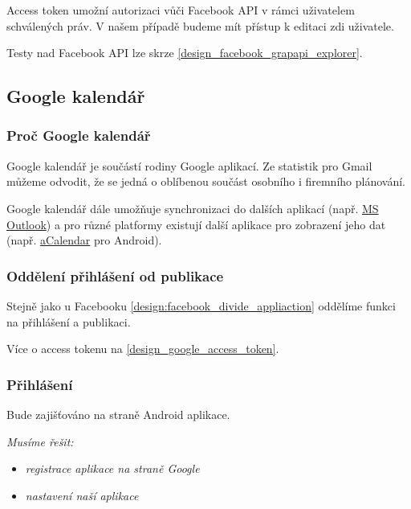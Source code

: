 \documentclass[thesis=B,czech]{FITthesis}[2012/06/26]
\begin{document}
Access token umožní autorizaci vůči Facebook API v rámci uživatelem schválených práv. V našem případě budeme mít přístup k editaci zdi uživatele.

Testy nad Facebook API lze skrze \ref{design_facebook_grapapi_explorer}.


\subsection{Google kalendář}

\subsubsection{Proč Google kalendář}

Google kalendář je součástí rodiny Google aplikací\cite{design_google_apps}. Ze statistik pro Gmail\cite{design_google_usage} můžeme odvodit, že se jedná o oblíbenou součást osobního i firemního plánování.

Google kalendář dále umožňuje synchronizaci do dalších aplikací (např. \href{''https://tools.google.com/dlpage/gappssync''}{MS Outlook}) a pro různé platformy existují další aplikace pro zobrazení jeho dat (např. \href{''https://play.google.com/store/apps/details?id=org.withouthat.acalendar&hl=cs''}{aCalendar} pro Android). 

\subsubsection{Oddělení přihlášení od publikace}

Stejně jako u Facebooku \ref{design:facebook_divide_appliaction} oddělíme funkci na přihlášení a publikaci.

Více o access tokenu na \ref{design_google_access_token}.

\subsubsection{Přihlášení}

Bude zajišťováno na straně Android aplikace.

\textit{Musíme řešit:}
\begin{itemize}[nosep]
	\item \textit{registrace aplikace na straně Google}
	\item \textit{nastavení naší aplikace}
\end{itemize}
\end{document}
